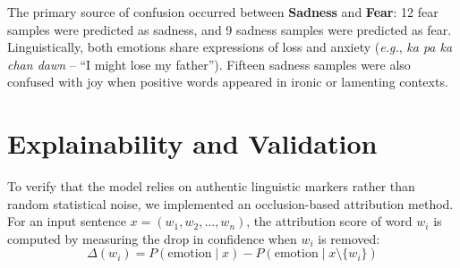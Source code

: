 \documentclass[conference]{IEEEtran}
\begin{document}
\begin{table}[htbp]
\caption{Confusion Matrix on the Unseen Test Partition}
\label{tab:confusion_matrix}
\centering
{}
\end{table}

The primary source of confusion occurred between \textbf{Sadness} and \textbf{Fear}: 12 fear samples were predicted as sadness, and 9 sadness samples were predicted as fear. Linguistically, both emotions share expressions of loss and anxiety (\textit{e.g.}, \textit{ka pa ka chan dawn} -- ``I might lose my father''). Fifteen sadness samples were also confused with joy when positive words appeared in ironic or lamenting contexts.

\section{Explainability and Validation}

To verify that the model relies on authentic linguistic markers rather than random statistical noise, we implemented an occlusion-based attribution method. For an input sentence $x = (w_1, w_2, \dots, w_n)$, the attribution score of word $w_i$ is computed by measuring the drop in confidence when $w_i$ is removed:
\begin{equation}
    \Delta(w_i) = P(\text{emotion} \mid x) - P(\text{emotion} \mid x \setminus \{w_i\})
\end{equation}
\end{document}
